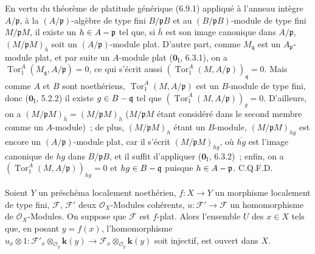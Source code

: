 En vertu du théorème de platitude générique (6.9.1) appliqué à l'anneau
intègre $A/\mathfrak p$, à la $(A/\mathfrak p)$-algèbre de type fini
$B/\mathfrak pB$ et au $(B/\mathfrak pB)$-module de type fini
$M/\mathfrak pM$, il existe un $h\in A-\mathfrak p$ tel que, si $\bar h$ est
son image canonique dans $A/\mathfrak p$,
$(M/\mathfrak pM)_{\bar h}$ soit un $(A/\mathfrak p)$-module plat. D'autre
part, comme $M_{\mathfrak q}$ est un $A_{\mathfrak p}$-module plat, et par
suite un $A$-module plat ($\mathbf 0_{\mathrm I}$, 6.3.1), on a
$\operatorname{Tor}_1^A(M_{\mathfrak q},A/\mathfrak p)=0$, ce qui s'écrit
aussi
$(\operatorname{Tor}_1^A(M,A/\mathfrak p))_{\mathfrak q}=0$. Mais comme $A$
et $B$ sont noethériens, $\operatorname{Tor}_1^A(M,A/\mathfrak p)$ est un
$B$-module de type fini, donc ($\mathbf 0_{\mathrm I}$, 5.2.2) il existe
$g\in B-\mathfrak q$ tel que
$(\operatorname{Tor}_1^A(M,A/\mathfrak p))_g=0$. D'ailleurs, on a
$(M/\mathfrak pM)_{\bar h}=(M/\mathfrak pM)_h$ ($M/\mathfrak pM$ étant
considéré dans le second membre comme un $A$-module)~; de plus,
$(M/\mathfrak pM)_h$ étant un $B$-module,
$(M/\mathfrak pM)_{hg}$ est encore un $(A/\mathfrak p)$-module plat, car il
s'écrit $(M/\mathfrak pM)_{\overline{hg}}$, où $\overline{hg}$ est l'image
canonique de $hg$ dans $B/\mathfrak pB$, et il suffit d'appliquer
($\mathbf 0_{\mathrm I}$, 6.3.2)~; enfin, on a
$(\operatorname{Tor}_1^A(M,A/\mathfrak p))_{hg}=0$ et
$hg\in B-\mathfrak q$ puisque $h\in A-\mathfrak p$. C.Q.F.D.

\begin{corollary}[11.1.2]
\label{IV.11.1.2-fr}
Soient $Y$ un préschéma localement noethérien, $f:X\to Y$ un morphisme
localement de type fini, $\mathcal F$, $\mathcal F'$ deux
$\mathcal O_X$-Modules cohérents,
$u:\mathcal F'\to\mathcal F$ un homomorphisme de $\mathcal O_X$-Modules. On
suppose que $\mathcal F$ est $f$-plat. Alors l'ensemble $U$ des $x\in X$ tels
que, en posant $y=f(x)$, l'homomorphisme
$u_x\otimes1:\mathcal F'_x\otimes_{\mathcal O_y}\boldsymbol{k}(y)\longrightarrow
  \mathcal F_x\otimes_{\mathcal O_y}\boldsymbol{k}(y)$
soit injectif, est ouvert dans $X$.
\end{corollary}

